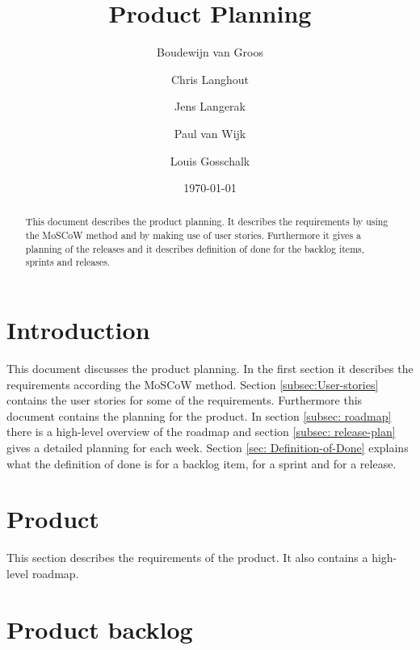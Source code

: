 \documentclass[a4paper]{article}
\title{Product Planning}
\author[1]{Boudewijn van Groos}
\author[2]{Chris Langhout}
\author[3]{Jens Langerak}
\author[4]{Paul van Wijk}
\author[5]{Louis Gosschalk}
\affil[1]{bvangroos \\
	4229843}
\affil[2]{clanghout \\
	4281705}
\affil[3]{jlangerak \\
	4317327}
\affil[4]{pvanwijk \\
	4285034}
\affil[5]{lgosschalk \\
	4214528}
\date{\today}
\begin{document}
\maketitle
\begin{abstract}
	This document describes the product planning. It describes the requirements by using the MoSCoW method and by making use of user stories. Furthermore it gives a planning of the releases and it describes definition of done for the backlog items, sprints and releases.
\end{abstract}
\newpage
\tableofcontents
\newpage

\section{Introduction}
This document discusses the product planning. In the first section it describes the requirements according the MoSCoW method. Section \ref{subsec:User-stories} contains the user stories for some of the requirements. Furthermore this document contains the planning for the product. In section \ref{subsec: roadmap} there is a high-level overview of the roadmap and section \ref{subsec: release-plan} gives a detailed planning for each week. Section \ref{sec: Definition-of-Done} explains what the definition of done is for a backlog item, for a sprint and for a release. 
\section{Product}
This section describes the requirements of the product. It also contains a high-level roadmap.


\section{Product backlog}



\end{document}
